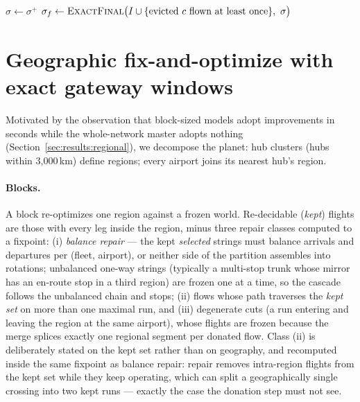 \documentclass[11pt]{article}
\begin{document}
\begin{algorithm}[t]
{  
  $\sigma \leftarrow \sigma^{+}$\;
}
$\sigma_f \leftarrow \textsc{ExactFinal}\bigl(I \cup
  \{\text{evicted } c \text{ flown at least once}\},\ \sigma\bigr)$
\caption{Autonomous design loop (Section~\ref{sec:design}).}
\label{alg:design}
\end{algorithm}

\section{Geographic fix-and-optimize with exact gateway windows}
\label{sec:regional}

Motivated by the observation that block-sized models adopt improvements in
seconds while the whole-network master adopts nothing
(Section~\ref{sec:results:regional}), we decompose the planet: hub clusters
(hubs within 3{,}000\,km) define regions; every airport joins its nearest
hub's region.

\paragraph{Blocks.} A block re-optimizes one region against a frozen world.
Re-decidable (\emph{kept}) flights are those with every leg inside the
region, minus three repair classes computed to a fixpoint: (i)
\emph{balance repair} --- the kept \emph{selected} strings must balance
arrivals and departures per (fleet, airport), or neither side of the
partition assembles into rotations; unbalanced one-way strings (typically a
multi-stop trunk whose mirror has an en-route stop in a third region) are
frozen one at a time, so the cascade follows the unbalanced chain and stops;
(ii) flows whose path traverses the \emph{kept set} on more than one maximal
run, and (iii) degenerate cuts (a run entering and leaving the region at the
same airport), whose flights are frozen because the merge splices exactly
one regional segment per donated flow. Class (ii) is deliberately stated on
the kept set rather than on geography, and recomputed inside the same
fixpoint as balance repair: repair removes intra-region flights from the
kept set while they keep operating, which can split a geographically single
crossing into two kept runs --- exactly the case the donation step must not
see.
\end{document}

